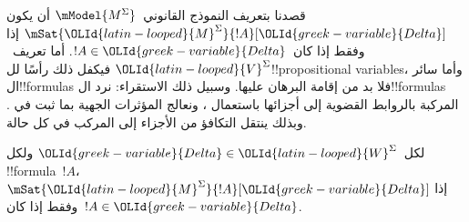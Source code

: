 \documentclass[../../../include/open-logic-section]{subfiles}
\begin{document}


قصدنا بتعريف النموذج القانوني~$\mModel{M^\Sigma}$ أن يكون
$\mSat{\OLId{latin-looped}{M}^\Sigma}{!A}[\OLId{greek-variable}{Delta}]$ إذا وفقط إذا كان~$!A \in \OLId{greek-variable}{Delta}$.
أما تعريف~$\OLId{latin-looped}{V}^\Sigma$ فيكفل ذلك رأسًا لل!!{propositional
variable}s، وأما سائر ال!!{formula}s فلا بد من إقامة البرهان عليها.
وسبيل ذلك الاستقراء: نرد ال!!{formula}s المركبة بالروابط القضوية
إلى أجزائها باستعمال ،
ونعالج المؤثرات الجهية بما ثبت في .
وبذلك ينتقل التكافؤ من الأجزاء إلى المركب في كل حالة.

\begin{prop}[لمّة الصدق]
  لكل~$\OLId{greek-variable}{Delta} \in \OLId{latin-looped}{W}^\Sigma$ ولكل !!{formula}~$!A$،
  $\mSat{\OLId{latin-looped}{M}^\Sigma}{!A}[\OLId{greek-variable}{Delta}]$ إذا وفقط إذا كان~$!A \in \OLId{greek-variable}{Delta}$.
\end{prop}
\end{document}
